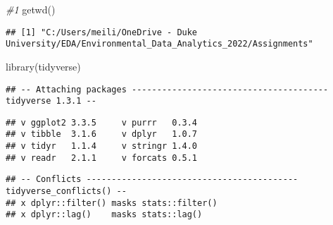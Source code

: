 \documentclass[
]{article}
\newenvironment{Shaded}{\begin{snugshade}}{\end{snugshade}}
\newcommand{\AttributeTok}[1]{\textcolor[rgb]{0.77,0.63,0.00}{#1}}
\newcommand{\CommentTok}[1]{\textcolor[rgb]{0.56,0.35,0.01}{\textit{#1}}}
\newcommand{\ConstantTok}[1]{\textcolor[rgb]{0.00,0.00,0.00}{#1}}
\newcommand{\FunctionTok}[1]{\textcolor[rgb]{0.00,0.00,0.00}{#1}}
\newcommand{\NormalTok}[1]{#1}
\newcommand{\OtherTok}[1]{\textcolor[rgb]{0.56,0.35,0.01}{#1}}
\newcommand{\SpecialCharTok}[1]{\textcolor[rgb]{0.00,0.00,0.00}{#1}}
\newcommand{\StringTok}[1]{\textcolor[rgb]{0.31,0.60,0.02}{#1}}
\begin{document}
\begin{Shaded}
\begin{Highlighting}[]
\CommentTok{\#1 }
\FunctionTok{getwd}\NormalTok{()}
\end{Highlighting}
\end{Shaded}

\begin{verbatim}
## [1] "C:/Users/meili/OneDrive - Duke University/EDA/Environmental_Data_Analytics_2022/Assignments"
\end{verbatim}

\begin{Shaded}
\begin{Highlighting}[]
\FunctionTok{library}\NormalTok{(tidyverse)}
\end{Highlighting}
\end{Shaded}

\begin{verbatim}
## -- Attaching packages --------------------------------------- tidyverse 1.3.1 --
\end{verbatim}

\begin{verbatim}
## v ggplot2 3.3.5     v purrr   0.3.4
## v tibble  3.1.6     v dplyr   1.0.7
## v tidyr   1.1.4     v stringr 1.4.0
## v readr   2.1.1     v forcats 0.5.1
\end{verbatim}

\begin{verbatim}
## -- Conflicts ------------------------------------------ tidyverse_conflicts() --
## x dplyr::filter() masks stats::filter()
## x dplyr::lag()    masks stats::lag()
\end{verbatim}

\begin{Shaded}
\end{Shaded}
\end{document}
